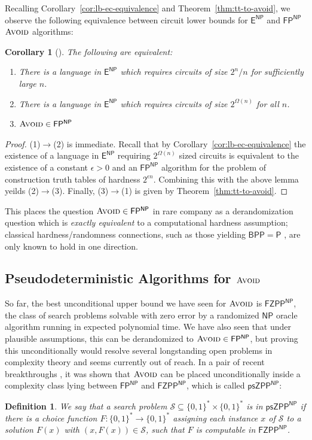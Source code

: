 \documentclass[11pt]{article}
\newtheorem{definition}{Definition}
\newtheorem{corollary}{Corollary}
\newcommand{\B}{\{0,1\}}
\newcommand{\avoid}{\textsc{Avoid}}
\begin{document}
Recalling Corollary~\ref{cor:lb-ec-equivalence} and Theorem~\ref{thm:tt-to-avoid}, we observe the following equivalence between circuit lower bounds for $\mathsf{E^{NP}}$ and $\mathsf{FP^{NP}}$ $\avoid$ algorithms:
\begin{corollary}[\cite{Korten1}]
The following are equivalent:
\begin{enumerate}
 	\item There is a language in $\mathsf{E^{NP}}$ which requires circuits of size $2^n/n$ for sufficiently large $n$.
	\item There is a language in $\mathsf{E^{NP}}$ which requires circuits of size $2^{\Omega(n)}$ for all $n$.
	\item $\avoid \in \mathsf{FP^{NP}}$
\end{enumerate}
\end{corollary}
\begin{proof}
(1)$\rightarrow$(2) is immediate. Recall that by Corollary~\ref{cor:lb-ec-equivalence} the existence of a language in $\mathsf{E^{NP}}$ requiring $2^{\Omega(n)}$ sized circuits is equivalent to the existence of a constant $\epsilon > 0$ and an $\mathsf{FP^{NP}}$ algorithm for the problem of construction truth tables of hardness $2^{\epsilon n}$. Combining this with the above lemma yeilds (2)$\rightarrow $(3). Finally, (3)$\rightarrow$(1) is given by Theorem~\ref{thm:tt-to-avoid}.
\end{proof}

This places the question $\avoid \in \mathsf{FP^{NP}}$ in rare company as a derandomization question which is \emph{exactly equivalent} to a computational hardness assumption; classical hardness/randomness connections, such as those yielding $\mathsf{BPP} = \mathsf{P}$ \cite{NW,IW}, are only known to hold in one direction. 


\subsection{Pseudodeterministic Algorithms for $\avoid$}\label{sec:pseudo-avoid}
So far, the best unconditional upper bound we have seen for $\avoid$ is $\mathsf{FZPP^{NP}}$, the class of search problems solvable with zero error by a randomized $\mathsf{NP}$ oracle algorithm running in expected polynomial time. We have also seen that under plausible assumptions, this can be derandomized to $\avoid \in \mathsf{FP^{NP}}$, but proving this unconditionally would resolve several longstanding open problems in complexity theory and seems currently out of reach. In a pair of recent breakthroughs \cite{CHR,Li}, it was shown that $\avoid$ can be placed unconditionally inside a complexity class lying between $\mathsf{FP^{NP}}$ and $\mathsf{FZPP^{NP}}$, which is called $\mathsf{psZPP^{NP}}$: 
\begin{definition}
We say that a search problem $\mathcal{S} \subseteq \B^* \times \B^*$ is in $\mathsf{psZPP^{NP}}$ if there is a choice function $F: \B^* \to \B^*$ assigning each instance $x$ of $\mathcal{S}$ to a solution $F(x)$ with $(x,F(x)) \in \mathcal{S}$, such that $F$ is computable in $\mathsf{FZPP^{NP}}$.
\end{definition}
\end{document}
